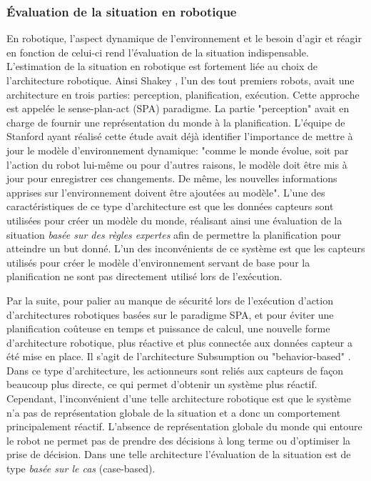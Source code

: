 \documentclass[a4paper,11pt,twoside]{StyleThese}
\begin{document}
\subsubsection{Évaluation de la situation en robotique}
En robotique, l'aspect dynamique de l'environnement et le besoin d'agir et réagir en fonction de celui-ci rend l'évaluation de la situation indispensable. L'estimation de la situation en robotique est fortement liée au choix de l'architecture robotique. Ainsi Shakey \cite{nilsson1969mobile}, l'un des tout premiers robots, avait une architecture en trois parties: perception, planification, exécution. Cette approche est appelée le sense-plan-act (SPA) paradigme.
La partie "perception" avait en charge de fournir une représentation du monde à la planification.
L'équipe de Stanford ayant réalisé cette étude avait déjà identifier l'importance de mettre à jour le modèle d'environnement dynamique: "comme le monde évolue, soit par l'action du robot lui-même ou pour d'autres raisons, le modèle doit être mis à jour pour enregistrer ces changements. De même, les nouvelles informations apprises sur l'environnement doivent être ajoutées au modèle".
L'une des caractéristiques de ce type d'architecture est que les données capteurs sont utilisées pour créer un modèle du monde, réalisant ainsi une évaluation de la situation \textit{basée sur des règles expertes} afin de permettre la planification pour atteindre un but donné. L'un des inconvénients de ce système est que les capteurs utilisés pour créer le modèle d'environnement servant de base pour la planification ne sont pas directement utilisé lors de l'exécution.

Par la suite, pour palier au manque de sécurité lors de l'exécution d'action d'architectures robotiques basées sur le paradigme SPA, et pour éviter une planification coûteuse en temps et puissance de calcul,
une nouvelle forme d'architecture robotique, plus réactive et plus connectée aux données capteur a été mise en place. Il s'agit de l'architecture Subsumption ou "behavior-based" \cite{brooks1986robust}. Dans ce type d'architecture, les actionneurs sont reliés aux capteurs de façon beaucoup plus directe, ce qui permet d'obtenir un système plus réactif. Cependant, l'inconvénient d'une telle architecture robotique est que le système n'a pas de représentation globale de la situation et a donc un comportement principalement réactif. L'absence de représentation globale du monde qui entoure le robot ne permet pas de prendre des décisions à long terme ou d'optimiser la prise de décision. Dans une telle architecture l'évaluation de la situation est de type \textit{basée sur le cas} (case-based).
\end{document}
